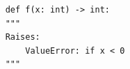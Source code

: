 \begin{verbatim}
    def f(x: int) -> int:
    """
    Raises:
        ValueError: if x < 0
    """
\end{verbatim}